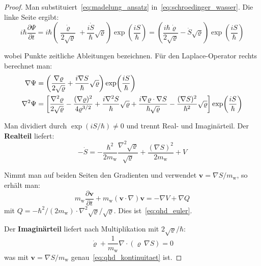 ﻿\documentclass[12pt,a4paper]{report}
\begin{document}
\begin{proof}
	Man substituiert~\eqref{eq:madelung_ansatz} in~\eqref{eq:schroedinger_wasser}. Die linke Seite ergibt:
	\begin{equation}
		i\hbar\frac{\partial\Psi}{\partial t} = i\hbar\left(\frac{\dot{\varrho}}{2\sqrt{\varrho}} + \frac{i\dot{S}}{\hbar}\sqrt{\varrho}\right)\exp\!\left(\frac{iS}{\hbar}\right)
		= \left(\frac{i\hbar\dot{\varrho}}{2\sqrt{\varrho}} - \dot{S}\sqrt{\varrho}\right)\exp\!\left(\frac{iS}{\hbar}\right)
		\label{eq:beweis_links}
	\end{equation}
	
	wobei Punkte zeitliche Ableitungen bezeichnen. Für den Laplace-Operator rechts berechnet man:
	\begin{align}
		\nabla\Psi &= \left(\frac{\nabla\varrho}{2\sqrt{\varrho}} + \frac{i\nabla S}{\hbar}\sqrt{\varrho}\right)\exp\!\left(\frac{iS}{\hbar}\right) \notag\\
		\nabla^2\Psi &= \left[\frac{\nabla^2\varrho}{2\sqrt{\varrho}} - \frac{(\nabla\varrho)^2}{4\varrho^{3/2}} + \frac{i\nabla^2 S}{\hbar}\sqrt{\varrho} + \frac{i\nabla\varrho\cdot\nabla S}{\hbar\sqrt{\varrho}} - \frac{(\nabla S)^2}{\hbar^2}\sqrt{\varrho}\right]\exp\!\left(\frac{iS}{\hbar}\right) \label{eq:beweis_laplace}
	\end{align}
	
	Man dividiert durch $\exp(iS/\hbar)\neq 0$ und trennt Real- und Imaginärteil. Der \textbf{Realteil} liefert:
	\begin{equation}
		-\dot{S} = -\frac{\hbar^2}{2m_\mathrm{w}}\frac{\nabla^2\sqrt{\varrho}}{\sqrt{\varrho}} + \frac{(\nabla S)^2}{2m_\mathrm{w}} + V
		\label{eq:beweis_real}
	\end{equation}
	
	Nimmt man auf beiden Seiten den Gradienten und verwendet $\mathbf{v} = \nabla S/m_\mathrm{w}$, so erhält man:
	\begin{equation}
		m_\mathrm{w}\frac{\partial\mathbf{v}}{\partial t} + m_\mathrm{w}(\mathbf{v}\cdot\nabla)\mathbf{v} = -\nabla V + \nabla Q
	\end{equation}
	mit $Q = -\hbar^2/(2m_\mathrm{w})\cdot \nabla^2\sqrt{\varrho}/\sqrt{\varrho}$. Dies ist~\eqref{eq:qhd_euler}.
	
	Der \textbf{Imaginärteil} liefert nach Multiplikation mit $2\sqrt{\varrho}/\hbar$:
	\begin{equation}
		\dot{\varrho} + \frac{1}{m_\mathrm{w}}\nabla\cdot(\varrho\,\nabla S) = 0
	\end{equation}
	was mit $\mathbf{v} = \nabla S/m_\mathrm{w}$ genau~\eqref{eq:qhd_kontinuitaet} ist.
\end{proof}
\end{document}
